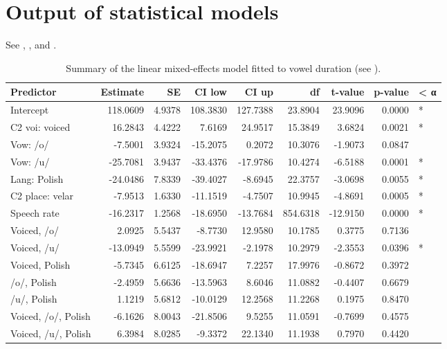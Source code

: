 \documentclass[12pt,]{article}
\begin{document}
\appendix

\hypertarget{output-of-statistical-models}{%
\section{Output of statistical
models}\label{output-of-statistical-models}}

\label{a:stats}

See , , and
.

\begin{table}

\caption{\label{tab:vow-table}Summary of the linear mixed-effects model fitted to vowel duration (see ).}
\centering
\begin{tabular}[t]{lrrrrrrrl}
\toprule
Predictor & Estimate & SE & CI low & CI up & df & t-value & p-value & < α\\
\midrule
Intercept & 118.0609 & 4.9378 & 108.3830 & 127.7388 & 23.8904 & 23.9096 & 0.0000 & *\\
C2 voi: voiced & 16.2843 & 4.4222 & 7.6169 & 24.9517 & 15.3849 & 3.6824 & 0.0021 & *\\
Vow: /o/ & -7.5001 & 3.9324 & -15.2075 & 0.2072 & 10.3076 & -1.9073 & 0.0847 & \\
Vow: /u/ & -25.7081 & 3.9437 & -33.4376 & -17.9786 & 10.4274 & -6.5188 & 0.0001 & *\\
Lang: Polish & -24.0486 & 7.8339 & -39.4027 & -8.6945 & 22.3757 & -3.0698 & 0.0055 & *\\
\addlinespace
C2 place: velar & -7.9513 & 1.6330 & -11.1519 & -4.7507 & 10.9945 & -4.8691 & 0.0005 & *\\
Speech rate & -16.2317 & 1.2568 & -18.6950 & -13.7684 & 854.6318 & -12.9150 & 0.0000 & *\\
Voiced, /o/ & 2.0925 & 5.5437 & -8.7730 & 12.9580 & 10.1785 & 0.3775 & 0.7136 & \\
Voiced, /u/ & -13.0949 & 5.5599 & -23.9921 & -2.1978 & 10.2979 & -2.3553 & 0.0396 & *\\
Voiced, Polish & -5.7345 & 6.6125 & -18.6947 & 7.2257 & 17.9976 & -0.8672 & 0.3972 & \\
\addlinespace
/o/, Polish & -2.4959 & 5.6636 & -13.5963 & 8.6046 & 11.0882 & -0.4407 & 0.6679 & \\
/u/, Polish & 1.1219 & 5.6812 & -10.0129 & 12.2568 & 11.2268 & 0.1975 & 0.8470 & \\
Voiced, /o/, Polish & -6.1626 & 8.0043 & -21.8506 & 9.5255 & 11.0591 & -0.7699 & 0.4575 & \\
Voiced, /u/, Polish & 6.3984 & 8.0285 & -9.3372 & 22.1340 & 11.1938 & 0.7970 & 0.4420 & \\
\bottomrule
\end{tabular}
\end{table}
\end{document}
